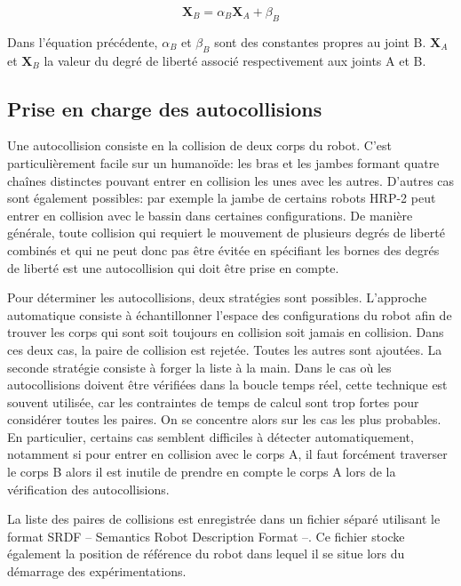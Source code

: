 \begin{equation}
  \mathbf{X}_B = \alpha_B \mathbf{X}_A + \beta_B
\end{equation}

Dans l'équation précédente, $\alpha_B$ et $\beta_B$ sont des
constantes propres au joint B. $\mathbf{X}_A$ et $\mathbf{X}_B$ la
valeur du degré de liberté associé respectivement aux joints A et B.


\subsection{Prise en charge des autocollisions}

Une autocollision consiste en la collision de deux corps du
robot. C'est particulièrement facile sur un humanoïde: les bras et les
jambes formant quatre chaînes distinctes pouvant entrer en collision
les unes avec les autres. D'autres cas sont également possibles: par
exemple la jambe de certains robots HRP-2 peut entrer en collision
avec le bassin dans certaines configurations. De manière générale,
toute collision qui requiert le mouvement de plusieurs degrés de
liberté combinés et qui ne peut donc pas être évitée en spécifiant les
bornes des degrés de liberté est une autocollision qui doit être prise
en compte.

Pour déterminer les autocollisions, deux stratégies sont
possibles. L'approche automatique consiste à échantillonner l'espace
des configurations du robot afin de trouver les corps qui sont soit
toujours en collision soit jamais en collision. Dans ces deux cas, la
paire de collision est rejetée. Toutes les autres sont ajoutées.  La
seconde stratégie consiste à forger la liste à la main. Dans le cas où
les autocollisions doivent être vérifiées dans la boucle temps réel,
cette technique est souvent utilisée, car les contraintes de temps de
calcul sont trop fortes pour considérer toutes les paires. On se
concentre alors sur les cas les plus probables. En particulier,
certains cas semblent difficiles à détecter automatiquement, notamment
si pour entrer en collision avec le corps A, il faut forcément
traverser le corps B alors il est inutile de prendre en compte le
corps A lors de la vérification des autocollisions.

La liste des paires de collisions est enregistrée dans un fichier
séparé utilisant le format SRDF -- Semantics Robot Description Format
--. Ce fichier stocke également la position de référence du robot dans
lequel il se situe lors du démarrage des expérimentations.


